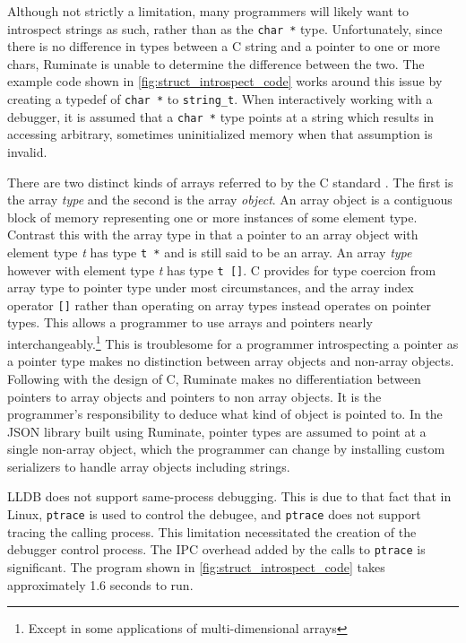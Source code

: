 \documentclass{report}
\begin{document}
Although not strictly a limitation, many programmers will likely want to
introspect strings as such, rather than as the \lstinline|char *| type.
Unfortunately, since there is no difference in types between a C string and a
pointer to one or more chars, Ruminate is unable to determine the difference
between the two. The example code shown in \cref{fig:struct_introspect_code}
works around this issue by creating a typedef of \lstinline|char *| to
\lstinline|string_t|. When interactively working with a debugger, it is assumed
that a \lstinline|char *| type points at a string which results in accessing
arbitrary, sometimes uninitialized memory when that assumption is invalid.

There are two distinct kinds of arrays referred to by the C standard
\autocite{c-standard}. The first is the array \emph{type} and the second is the
array \emph{object}. An array object is a contiguous block of memory
representing one or more instances of some element type. Contrast this with the
array type in that a pointer to an array object with element type \emph{t} has
type \lstinline|t *| and is still said to be an array. An array \emph{type}
however with element type \emph{t} has type \lstinline|t []|. C provides for
type coercion from array type to pointer type under most circumstances, and the
array index operator \lstinline|[]| rather than operating on array types instead
operates on pointer types. This allows a programmer to use arrays and pointers
nearly interchangeably.\footnote{Except in some applications of
multi-dimensional arrays} This is troublesome for a programmer introspecting a
pointer as a pointer type makes no distinction between array objects and
non-array objects.  Following with the design of C, Ruminate makes no
differentiation between pointers to array objects and pointers to non array
objects. It is the programmer's responsibility to deduce what kind of object is
pointed to. In the JSON library built using Ruminate, pointer types are assumed
to point at a single non-array object, which the programmer can change by
installing custom serializers to handle array objects including strings.

LLDB does not support same-process debugging. This is due to that fact that in
Linux, \lstinline|ptrace| is used to control the debugee, and \lstinline|ptrace| does
not support tracing the calling process.  This limitation necessitated the
creation of the debugger control process. The IPC overhead added by the calls to
\lstinline|ptrace| is significant. The program shown in
\cref{fig:struct_introspect_code} takes approximately 1.6 seconds to run.
\end{document}
